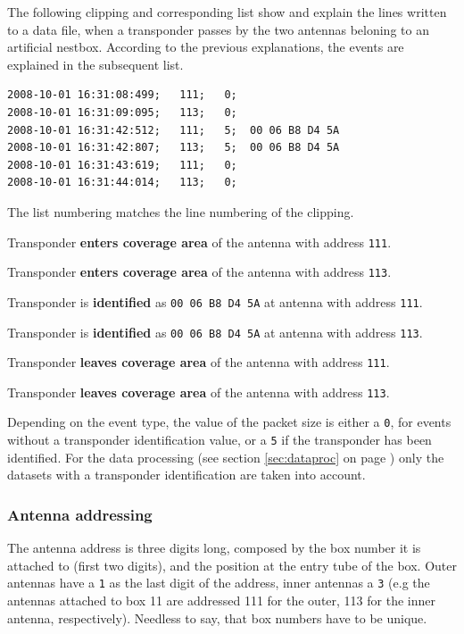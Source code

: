 The following clipping and corresponding list show and explain the lines written to a data file, when a transponder passes by the two antennas beloning to an artificial nestbox. According to the previous explanations, the events are explained in the subsequent list.  

\numcodestyle
\begin{lstlisting}[frame=none]
2008-10-01 16:31:08:499;   111;   0; 
2008-10-01 16:31:09:095;   113;   0; 
2008-10-01 16:31:42:512;   111;   5;  00 06 B8 D4 5A
2008-10-01 16:31:42:807;   113;   5;  00 06 B8 D4 5A
2008-10-01 16:31:43:619;   111;   0; 
2008-10-01 16:31:44:014;   113;   0;
\end{lstlisting}

The list numbering matches the line numbering of the clipping.  

\begin{condensed_enum}
  \item Transponder \textbf{enters coverage area} of the antenna with address \lstinline|111|.
  \item Transponder \textbf{enters coverage area} of the antenna with address \lstinline|113|.
  \item Transponder is \textbf{identified} as \lstinline|00 06 B8 D4 5A| at antenna with address \lstinline|111|.
  \item Transponder is \textbf{identified} as \lstinline|00 06 B8 D4 5A| at antenna with address \lstinline|113|.
  \item Transponder \textbf{leaves coverage area} of the antenna with address \lstinline|111|.
  \item Transponder \textbf{leaves coverage area} of the antenna with address \lstinline|113|. 
\end{condensed_enum}
 
Depending on the event type, the value of the packet size is either a \lstinline|0|, for events without a transponder identification value, or a \lstinline|5| if the transponder has been identified. For the data processing (see section \ref{sec:dataproc} on page \pageref{sec:dataproc}) only the datasets with a transponder identification are taken into account.

\subsubsection{Antenna addressing}
\label{subsubsec:addressing}

The antenna address is three digits long, composed by the box number it is attached to (first two digits), and the position at the entry tube of the box. Outer antennas have a \lstinline|1| as the last digit of the address, inner antennas a \lstinline|3| (e.g the antennas attached to box 11 are addressed 111 for the outer, 113 for the inner antenna, respectively). Needless to say, that box numbers have to be unique.

